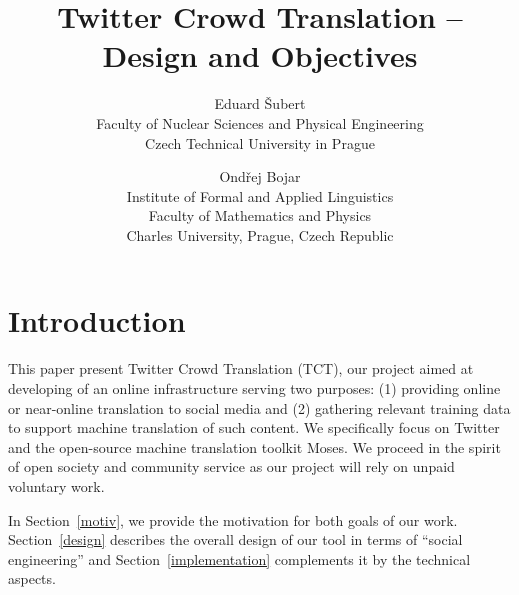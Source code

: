 \documentclass[11pt]{article}
\begin{document}
\title{\textbf{Twitter Crowd Translation -- Design and Objectives}}
\author{
Eduard \v{S}ubert\\
Faculty of Nuclear Sciences and Physical Engineering\\
Czech Technical University in Prague
\and
Ond\v{r}ej Bojar\\
Institute of Formal and Applied Linguistics\\
Faculty of Mathematics and Physics\\
Charles University, Prague, Czech Republic
}

\renewcommand{\today}{June 20, 2014}
\maketitle

\def\footurl#1{\footnote{\tt{} #1}}
\def\equo#1{``#1''}

\def\hashtag#1{\texttt{\##1}}

\def\Sref#1{Section~\ref{#1}}
\def\Fref#1{Figure~\ref{#1}}

\maketitle
%
\section{Introduction}

This paper present Twitter Crowd Translation (TCT), our project aimed at
developing of
an online infrastructure serving two
purposes:
(1) providing online or near-online translation to social media and (2)
gathering relevant training data to support machine translation of such content.
We specifically focus on Twitter and the open-source machine translation toolkit
Moses. We proceed in the spirit of open society and community service as our
project will rely on unpaid voluntary work.

In \Sref{motiv}, we provide the motivation for both goals of our work.
\Sref{design} describes the overall design of our tool in terms of
\equo{social engineering} and \Sref{implementation} complements it by the
technical aspects.
\end{document}
